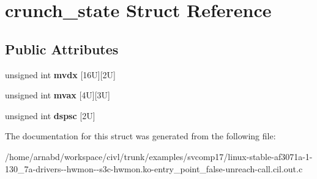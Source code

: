 \hypertarget{structcrunch__state}{}\section{crunch\+\_\+state Struct Reference}
\label{structcrunch__state}
\subsection*{Public Attributes}
\begin{DoxyCompactItemize}
\item 
\hypertarget{structcrunch__state_ad600cd2e970969664e3d1ea2d89fcf80}{}unsigned int {\bfseries mvdx} \mbox{[}16\+U\mbox{]}\mbox{[}2\+U\mbox{]}\label{structcrunch__state_ad600cd2e970969664e3d1ea2d89fcf80}

\item 
\hypertarget{structcrunch__state_a71da1d1e18da0a56ded6a95101f70668}{}unsigned int {\bfseries mvax} \mbox{[}4\+U\mbox{]}\mbox{[}3\+U\mbox{]}\label{structcrunch__state_a71da1d1e18da0a56ded6a95101f70668}

\item 
\hypertarget{structcrunch__state_a68ad28af170e7996b6ad9ee43c5086bc}{}unsigned int {\bfseries dspsc} \mbox{[}2\+U\mbox{]}\label{structcrunch__state_a68ad28af170e7996b6ad9ee43c5086bc}

\end{DoxyCompactItemize}


The documentation for this struct was generated from the following file\+:\begin{DoxyCompactItemize}
\item 
/home/arnabd/workspace/civl/trunk/examples/svcomp17/linux-\/stable-\/af3071a-\/1-\/130\+\_\+7a-\/drivers-\/-\/hwmon-\/-\/s3c-\/hwmon.\+ko-\/entry\+\_\+point\+\_\+false-\/unreach-\/call.\+cil.\+out.\+c\end{DoxyCompactItemize}
